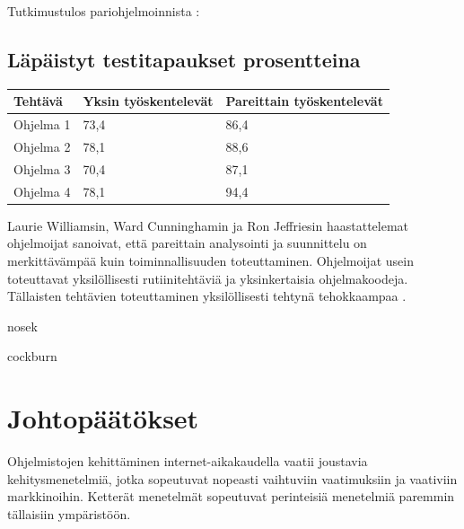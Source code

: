 \documentclass[finnish]{tktltiki2}
\theoremstyle{definition}
\theoremstyle{remark}
\begin{document}
Tutkimustulos pariohjelmoinnista \cite{WIL00}:

\subsection*{Läpäistyt testitapaukset prosentteina}
\begin{center}
    \begin{tabular}{ | l | l | p{5cm} |}
    \hline
    Tehtävä & Yksin työskentelevät & Pareittain työskentelevät \\ \hline
    Ohjelma 1 & 73,4 & 86,4 \\ \hline
    Ohjelma 2 & 78,1 & 88,6 \\ \hline
    Ohjelma 3 & 70,4 & 87,1 \\ \hline
    Ohjelma 4 & 78,1 & 94,4 \\ \hline
    \end{tabular}
\end{center}


Laurie Williamsin, Ward Cunninghamin ja Ron Jeffriesin haastattelemat ohjelmoijat sanoivat, että pareittain analysointi ja suunnittelu on merkittävämpää kuin toiminnallisuuden toteuttaminen. Ohjelmoijat usein toteuttavat yksilöllisesti rutiinitehtäviä ja yksinkertaisia ohjelmakoodeja. Tällaisten tehtävien toteuttaminen yksilöllisesti tehtynä tehokkaampaa \cite{WIL00}.

nosek \cite{NOS98}

cockburn \cite{COC00a}

\section{Johtopäätökset}

Ohjelmistojen kehittäminen internet-aikakaudella vaatii joustavia kehitysmenetelmiä, jotka sopeutuvat nopeasti vaihtuviin vaatimuksiin ja vaativiin markkinoihin. Ketterät menetelmät sopeutuvat perinteisiä menetelmiä paremmin tällaisiin ympäristöön.


%
%
% 
%



\end{document}
